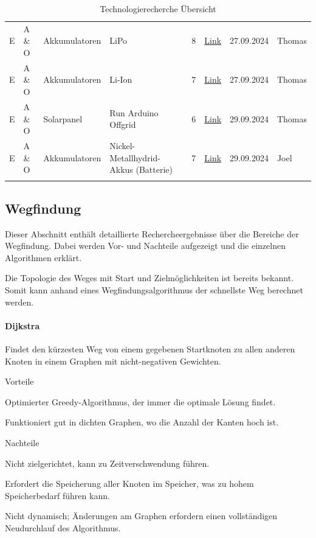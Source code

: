 \documentclass[../main.tex]{subfiles}
\begin{document}
\begin{longtable}{lp{2cm}p{2cm}p{4cm}clcl}
\tabularnewline
E & A \& O & Akkumulatoren & LiPo & 8 & \href{https://www.lion-care.com/lipo-akkus-eigenschaften-vorteile-und-mehr}{Link} & 27.09.2024 & Thomas
\tabularnewline
E & A \& O & Akkumulatoren & Li-Ion & 7 & \href{https://poleenergy.ch/shop_content.php?coID=32}{Link} & 27.09.2024 & Thomas
\tabularnewline
E & A \& O & Solarpanel & Run Arduino Offgrid & 6 & \href{https://voltaicsystems.com/solar-arduino-guide/}{Link} & 29.09.2024 & Thomas
\tabularnewline
E & A \& O & Akkumulatoren & Nickel-Metallhydrid-Akkus \newline (Batterie) & 7 & \href{https://voltaicsystems.com/solar-arduino-guide/}{Link} & 29.09.2024 & Joel
\tabularnewline
\caption{Technologierecherche Übersicht}
\label{tab:technologierecherche}
\end{longtable}
\normalsize




\newpage
\subsection{Wegfindung}

Dieser Abschnitt enthält detaillierte Rechercheergebnisse über die Bereiche der Wegfindung. Dabei werden Vor- und Nachteile aufgezeigt und die einzelnen Algorithmen erklärt.

Die Topologie des Weges mit Start und Zielmöglichkeiten ist bereits bekannt.
Somit kann anhand eines Wegfindungsalgorithmus der schnellste Weg berechnet werden.

\paragraph{Dijkstra}

Findet den kürzesten Weg von einem gegebenen Startknoten zu allen anderen Knoten in einem Graphen mit nicht-negativen Gewichten.

\begin{minipage}[t]{0.48\textwidth}
\begin{items}
  \item [Vorteile]
  \item Optimierter Greedy-Algorithmus, der immer die optimale Lösung findet.
  \item Funktioniert gut in dichten Graphen, wo die Anzahl der Kanten hoch ist.
\end{items}
\end{minipage}
\hfill
\begin{minipage}[t]{0.48\textwidth}
\begin{items}
  \item [Nachteile]
  \item Nicht zielgerichtet, kann zu Zeitverschwendung führen.
  \item Erfordert die Speicherung aller Knoten im Speicher, was zu hohem Speicherbedarf führen kann.
  \item Nicht dynamisch; Änderungen am Graphen erfordern einen vollständigen Neudurchlauf des Algorithmus.
\end{items}
\end{minipage}
\end{document}
